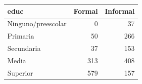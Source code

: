 \begin{tabular}{lrr}
\toprule
educ & Formal & Informal \\
\midrule
Ninguno/preescolar & 0 & 37 \\
Primaria & 50 & 266 \\
Secundaria & 37 & 153 \\
Media & 313 & 408 \\
Superior & 579 & 157 \\
\bottomrule
\end{tabular}
